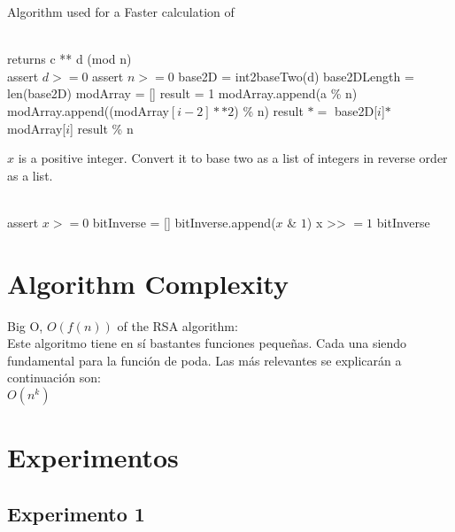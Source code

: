\documentclass[conference]{IEEEtran}
\begin{document}
\begin{algorithm}
   \caption{Algorithm used for a Faster calculation of }
    \begin{algorithmic}[1]
    \\
    \Comment returns c ** d (mod n)\\
	\State assert $d>= 0$
	\State assert $n>= 0$
	\State base2D = int2baseTwo(d) 
	\State base2DLength = len(base2D)
	\State modArray = []
	\State result = 1
	        \State modArray.append(a \% n)
	    \Else
	        \State modArray.append((modArray$[i - 2] ** 2$) \% n)
	    \EndIf
	\EndFor
	        \State result $*=$ base2D[$i$]$*$ modArray[$i$]
	    \EndIf
	\EndFor
	\State \Return result \% n
    \EndFunction
\end{algorithmic}
\end{algorithm}
  \begin{algorithm}
   \caption{$x$ is a positive integer. Convert it to base two as a list of integers
    in reverse order as a list.}
    \begin{algorithmic}[1]
    \\
        \State assert $x>= 0$
        \State bitInverse = []
            \State bitInverse.append($x$ \& $1$)
            \State x >> $=1$
        \EndWhile
        \State \Return bitInverse
    \EndFunction
\end{algorithmic}
\end{algorithm}

\section{Algorithm Complexity}
Big O, $O(f(n))$ of the RSA algorithm:\\
Este algoritmo tiene en s\'i bastantes funciones  pequeñas. Cada una siendo fundamental para la funci\'on de poda. Las m\'as relevantes se explicar\'an a continuaci\'on son:\\
$O(n^k)$


\section{Experimentos}
\subsection{Experimento 1}


\end{document}
